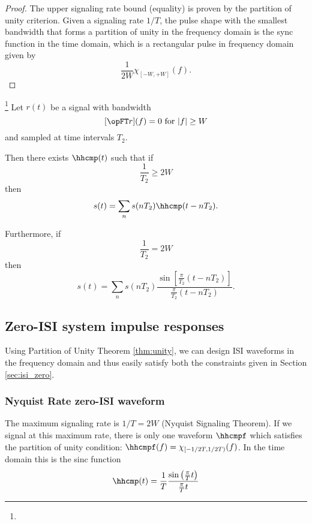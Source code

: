\begin{proof}
The upper signaling rate bound (equality) is proven by the
partition of unity criterion.
Given a signaling rate $1/T$, the pulse shape with the smallest
bandwidth that forms a partition of unity in the frequency domain
is the sync function in the time domain,
which is a rectangular pulse in frequency domain given by
\[ \frac{1}{2W} \chi_{[-W,+W]}(f). \]
\end{proof}

\begin{theorem}
\footnote{
  }
\label{thm:sst}
Let $r(t)$ be a signal with bandwidth
         \[ [\opFT r](f) = 0 \mbox{ for } |f|\ge W  \]
and sampled at time intervals $T_2$.

Then there exists $\hhcmp(t)$ such that if
   \[  \frac{1}{T_2} \ge 2W \]
then
   \[ s(t) = \sum_n s(nT_2) \hhcmp(t-nT_2). \]

Furthermore, if
   \[  \frac{1}{T_2} = 2W \]
then
   \[
      s(t) = \sum_n s(nT_2) \frac{\sin\left[ \frac{\pi}{T_2}(t-nT_2) \right]}
                               {           \frac{\pi}{T_2}(t-nT_2)}.
   \]
\end{theorem}


\subsection{Zero-ISI system impulse responses}
Using Partition of Unity Theorem \ref{thm:unity},
we can design ISI waveforms in the frequency domain and thus
easily satisfy both the constraints given in Section \ref{sec:isi_zero}.

\subsubsection{Nyquist Rate zero-ISI waveform}
The maximum signaling rate is $1/T=2W$ (Nyquist Signaling Theorem).
If we signal at this maximum rate, there is only one waveform $\hhcmpf$
which satisfies the partition of unity condition:
$\hhcmpf(f) = \chi_{[-1/2T,1/2T)}(f)$.
In the time domain this is the sinc function
\[
   \hhcmp(t)=\frac{1}{T} \frac{\sin\left(\frac{\pi}{T}t\right)}{\frac{\pi}{T}t}
\]


